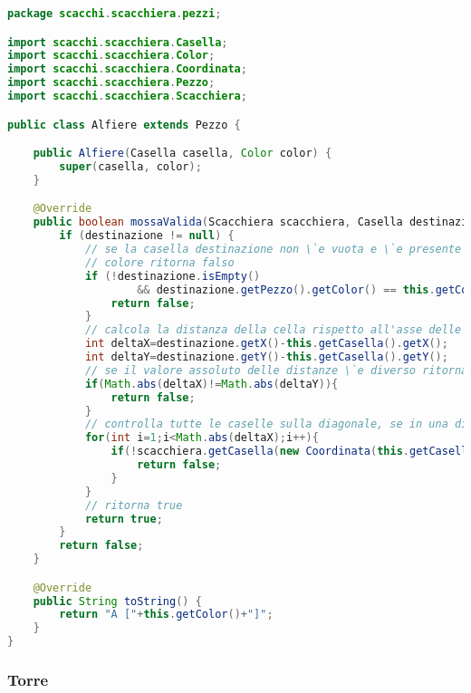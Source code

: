 \documentclass{article}
\begin{document}
\begin{lstlisting}[language=Java,escapechar=|]
package scacchi.scacchiera.pezzi;

import scacchi.scacchiera.Casella;
import scacchi.scacchiera.Color;
import scacchi.scacchiera.Coordinata;
import scacchi.scacchiera.Pezzo;
import scacchi.scacchiera.Scacchiera;

public class Alfiere extends Pezzo {

	public Alfiere(Casella casella, Color color) {
		super(casella, color);
	}

	@Override
	public boolean mossaValida(Scacchiera scacchiera, Casella destinazione) {
		if (destinazione != null) {
			// se la casella destinazione non \`e vuota e \`e presente un Pezzo dello stesso
			// colore ritorna falso
			if (!destinazione.isEmpty()
					&& destinazione.getPezzo().getColor() == this.getColor()) {
				return false;
			}
			// calcola la distanza della cella rispetto all'asse delle x e delle y
			int deltaX=destinazione.getX()-this.getCasella().getX();
			int deltaY=destinazione.getY()-this.getCasella().getY();
			// se il valore assoluto delle distanze \`e diverso ritorna false
			if(Math.abs(deltaX)!=Math.abs(deltaY)){
				return false;
			}
			// controlla tutte le caselle sulla diagonale, se in una di queste c'e' un pezzo ritorna false
			for(int i=1;i<Math.abs(deltaX);i++){
				if(!scacchiera.getCasella(new Coordinata(this.getCasella().getX()+Integer.signum(deltaX)*i, this.getCasella().getY()+Integer.signum(deltaY)*i)).isEmpty()){
					return false;
				}
			}
			// ritorna true
			return true;
		}
		return false;
	}

	@Override
	public String toString() {
		return "A ["+this.getColor()+"]";
	}
}
\end{lstlisting}

\subsubsection{Torre}
\end{document}
